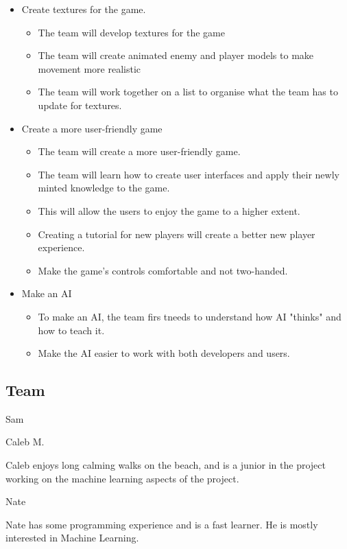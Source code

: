 \documentclass[11pt]{article}
\begin{document}
\begin{itemize}
	\item Create textures for the game.
		\begin{itemize}
			\item The team will develop textures for the game
			\item The team will create animated enemy and player models to make movement more realistic
			\item The team will work together on a list to organise what the team has to update for textures.
		\end{itemize}
	\item Create a more user-friendly game
		\begin{itemize}
			\item The team will create a more user-friendly game.
			\item The team will learn how to create user interfaces and apply their newly minted knowledge to the game.
			\item This will allow the users to enjoy the game to a higher extent.
			\item Creating a tutorial for new players will create a better new player experience.
			\item Make the game's controls comfortable and not two-handed.
		\end{itemize}
	\item Make an AI
		\begin{itemize}
			\item To make an AI, the team firs tneeds to understand how AI "thinks" and how to teach it.
			\item Make the AI easier to work with both developers and users.
		\end{itemize}
\end{itemize}

\subsection{{\color{blue}Team}}

{\large {\color{orange}Sam}}



{\large {\color{orange}Caleb M.}}

Caleb enjoys long calming walks on the beach, and is a junior in the project working on the machine learning aspects of the project.

{\large {\color{orange}Nate}}

Nate has some programming experience and is a fast learner. He is mostly interested in Machine Learning.
\end{document}
